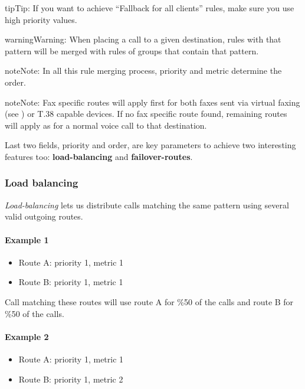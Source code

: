 \documentclass[letterpaper,10pt,english]{sphinxmanual}
\begin{document}
\begin{notice}{tip}{Tip:}
If you want to achieve ``Fallback for all clients'' rules, make sure you use high priority values.
\end{notice}

\begin{notice}{warning}{Warning:}
When placing a call to a given destination, rules with that pattern will be merged with rules of groups that contain that pattern.
\end{notice}

\begin{notice}{note}{Note:}
In all this rule merging process, priority and metric determine the order.
\end{notice}

\begin{notice}{note}{Note:}
Fax specific routes will apply first for both faxes sent via virtual faxing (see {\hyperref[administration_portal/client/vpbx/faxes:faxes]{}}) or T.38 capable devices. If no fax
specific route found, remaining routes will apply as for a normal voice call to that destination.
\end{notice}

Last two fields, priority and order, are key parameters to achieve two interesting features too: \textbf{load-balancing} and \textbf{failover-routes}.


\subsubsection{Load balancing}
\label{administration_portal/brand/routing/outgoing_routings:load-balancing}
\emph{Load-balancing} lets us distribute calls matching the same pattern using
several valid outgoing routes.
\paragraph{Example 1}
\begin{itemize}
\item {} 
Route A: priority 1, metric 1

\item {} 
Route B: priority 1, metric 1

\end{itemize}

Call matching these routes will use route A for \%50 of the calls and route B for
\%50 of the calls.
\paragraph{Example 2}
\begin{itemize}
\item {} 
Route A: priority 1, metric 1

\item {} 
Route B: priority 1, metric 2

\end{itemize}
\end{document}
